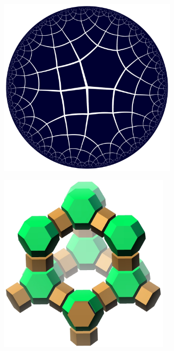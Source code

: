 \documentclass{beamer}
\begin{document}
\begin{frame}
  \begin{center}
    \includegraphics[height=3.5in]{hqc0576.jpg}
  \end{center}
\end{frame}

\begin{frame}
  \begin{center}
    \includegraphics[height=3.5in]{fau-cages.eps}
  \end{center}
\end{frame}
\end{document}
